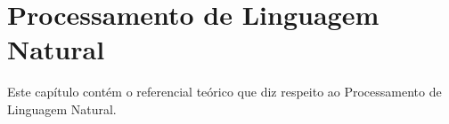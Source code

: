 \clearpage
\chapter{Processamento de Linguagem Natural}

Este capítulo contém o referencial teórico que diz respeito ao Processamento de Linguagem Natural.



